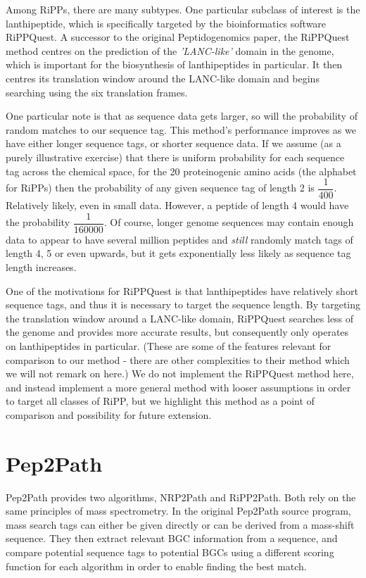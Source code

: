 \documentclass{l4proj}
\newcommand{\cit}[1]{\citep{#1}}
\begin{document}
Among RiPPs, there are many subtypes. One particular subclass of interest is the lanthipeptide, which is specifically targeted by the bioinformatics software RiPPQuest. \cit{rippq} A successor to the original Peptidogenomics paper, the RiPPQuest method centres on the prediction of the \textit{'LANC-like'} domain in the genome, which is important for the biosynthesis of lanthipeptides in particular. It then centres its translation window around the LANC-like domain and begins searching using the six translation frames. 

One particular note is that as sequence data gets larger, so will the probability of random matches to our sequence tag. This method's performance improves as we have either longer sequence tags, or shorter sequence data. If we assume (as a purely illustrative exercise) that there is uniform probability for each sequence tag across the chemical space, for the 20 proteinogenic amino acids (the alphabet for RiPPs) then the probability of any given sequence tag of length 2 is \(\dfrac{1}{400}\). Relatively likely, even in small data. However, a peptide of length 4 would have the probability \(\dfrac{1}{160000}\). Of course, longer genome sequences may contain enough data to appear to have several million peptides and \textit{still} randomly match tags of length 4, 5 or even upwards, but it gets exponentially less likely as sequence tag length increases.

One of the motivations for RiPPQuest is that lanthipeptides have relatively short sequence tags, and thus it is necessary to target the sequence length. By targeting the translation window around a LANC-like domain, RiPPQuest searches less of the genome and provides more accurate results, but consequently only operates on lanthipeptides in particular. (These are some of the features relevant for comparison to our method - there are other complexities to their method which we will not remark on here.) We do not implement the RiPPQuest method here, and instead implement a more general method with looser assumptions in order to target all classes of RiPP, but we highlight this method as a point of comparison and possibility for future extension.

\section{Pep2Path}

Pep2Path \cit{p2p} provides two algorithms, NRP2Path and RiPP2Path. Both rely on the same principles of mass spectrometry. In the original Pep2Path source program, mass search tags can either be given directly or can be derived from a mass-shift sequence. They then extract relevant BGC information from a sequence, and compare potential sequence tags to potential BGCs using a different scoring function for each algorithm in order to enable finding the best match.
\end{document}
